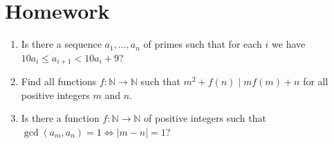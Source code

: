 \documentclass{article}
\newcommand\Nn{\mathbb{N}}
\begin{document}
\section{Homework}
\begin{enumerate}
  \item Is there a sequence $a_1,\ldots,a_n$ of primes such that for each $i$ we
    have $10 a_i\le a_{i+1}<10a_i+9$?
  \item Find all functions $f:\Nn\to\Nn$ such that $m^2+f(n)\mid
    mf(m)+n$ for all positive integers $m$ and $n$.
  \item Is there a function $f:\Nn\to\Nn$ of positive integers such that
    $\gcd(a_m,a_n)=1\iff |m-n|=1$?
\end{enumerate}
\end{document}
